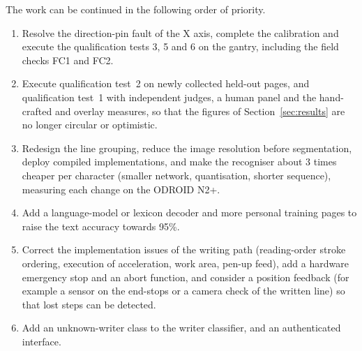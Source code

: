 The work can be continued in the following order of priority.
\begin{enumerate}
  \item Resolve the direction-pin fault of the X axis, complete the calibration and execute the qualification tests 3, 5 and 6 on the gantry, including the field checks FC1 and FC2.
  \item Execute qualification test~2 on newly collected held-out pages, and qualification test~1 with independent judges, a human panel and the hand-crafted and overlay measures, so that the figures of Section~\ref{sec:results} are no longer circular or optimistic.
  \item Redesign the line grouping, reduce the image resolution before segmentation, deploy compiled implementations, and make the recogniser about 3 times cheaper per character (smaller network, quantisation, shorter sequence), measuring each change on the ODROID N2+.
  \item Add a language-model or lexicon decoder and more personal training pages to raise the text accuracy towards 95\%.
  \item Correct the implementation issues of the writing path (reading-order stroke ordering, execution of acceleration, work area, pen-up feed), add a hardware emergency stop and an abort function, and consider a position feedback (for example a sensor on the end-stops or a camera check of the written line) so that lost steps can be detected.
  \item Add an unknown-writer class to the writer classifier, and an authenticated interface.
\end{enumerate}

